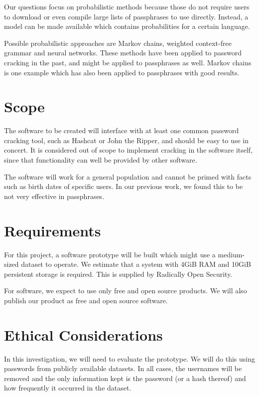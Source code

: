 \documentclass{article}
\begin{document}
Our questions focus on probabilistic methods because those do not require users
to download or even compile large lists of passphrases to use directly.
Instead, a model can be made available which contains probabilities for a
certain language.

Possible probabilistic approaches are Markov chains, weighted context-free
grammar and neural networks. These methods have been applied to password
cracking in the past, and might be applied to passphrases as well. Markov
chains is one example which has also been applied to
passphrases\cite{sparell-simovits} with good results.


\section{Scope}

The software to be created will interface with at least one common password
cracking tool, such as Hashcat or John the Ripper, and should be easy to use in
concert. It is considered out of scope to implement cracking in the software
itself, since that functionality can well be provided by other software.

The software will work for a general population and cannot be primed with facts
such as birth dates of specific users. In our previous work\cite{own}, we found
this to be not very effective in passphrases.


\section{Requirements}

For this project, a software prototype will be built which might use a
medium-sized dataset to operate. We estimate that a system with 4GiB RAM and
10GiB persistent storage is required. This is supplied by Radically Open
Security.

For software, we expect to use only free and open source products. We will also
publish our product as free and open source software.


\section{Ethical Considerations}

In this investigation, we will need to evaluate the prototype. We will do this
using passwords from publicly available datasets. In all cases, the usernames
will be removed and the only information kept is the password (or a hash
thereof) and how frequently it occurred in the dataset.
\end{document}
